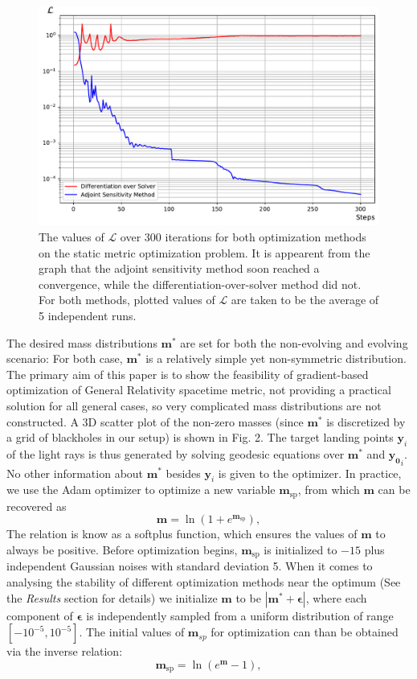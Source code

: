 \documentclass[conference]{IEEEtran}
\begin{document}
\begin{figure}[htbp]
\centerline{\includegraphics[width=\columnwidth]{loss_plot.pdf}}
\caption{The values of $\mathcal{L}$ over 300 iterations for 
both optimization methods on the static metric optimization problem. 
It is appearent from the graph that the adjoint sensitivity method soon 
reached a convergence, while the differentiation-over-solver method 
did not. For both methods, plotted values of $\mathcal{L}$ are taken 
to be the average of 5 independent runs.}
\label{fig}
\end{figure}

The desired mass distributions $\mathbf{m}^*$ are set for both the non-evolving 
and evolving scenario: For both case, $\mathbf{m}^*$ is a relatively simple yet 
non-symmetric distribution. The primary aim of this paper is to show the 
feasibility of gradient-based optimization of General Relativity spacetime metric, 
not providing a practical solution for all general cases, 
so very complicated mass distributions are not constructed. A 3D scatter plot 
of the non-zero masses (since $\mathbf{m}^*$ is discretized by a 
grid of blackholes in our setup) is shown in Fig. 2. The target landing points 
$\mathbf{y}_i$ of the light rays is thus generated by solving geodesic equations 
over $\mathbf{m}^*$ and $\mathbf{y_0}_i$. No other information about $\mathbf{m}^*$ 
besides $\mathbf{y}_i$ is given to the optimizer. In practice, we use the 
Adam optimizer to optimize a new variable $\mathbf{m}_{\mathrm{sp}}$, from which 
$\mathbf{m}$ can be recovered as 
\[
\mathbf{m} = \ln(1+e^{\mathbf{m}_{\mathrm{sp}}}),
\]
The relation is know as a softplus function, which ensures the values 
of $\mathbf{m}$ to always be positive. 
Before optimization begins, $\mathbf{m}_{\mathrm{sp}}$ is initialized to $-15$ plus 
independent Gaussian noises with standard deviation 5. 
When it comes to 
analysing the stability of different optimization methods near the optimum (See the \textit{Results} 
section for details) 
we initialize $\mathbf{m}$ to be $|\mathbf{m}^* + \boldsymbol{\epsilon}|$, where each component of $\boldsymbol{\epsilon}$ is 
independently sampled from a uniform distribution of range $[-10^{-5}, 10^{-5}]$.
The initial values of $\mathbf{m}_{sp}$ for optimization can than be obtained via 
the inverse relation:
\[
\mathbf{m}_{\mathrm{sp}} = \ln(e^{\mathbf{m}} - 1),
\]
\end{document}
